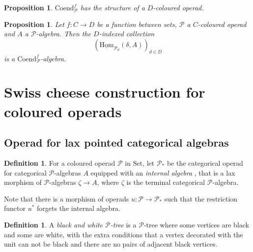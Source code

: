 \documentclass[]{amsart}
\newtheorem{proposition}[theorem]{Proposition}
\theoremstyle{definition}
\newtheorem{definition}[theorem]{Definition}
\begin{document}
\begin{proposition}\cite[Proposition 4.4]{mccluresmith}
	$\mathrm{Coend}_\mathcal{P}^f$ has the structure of a $D$-coloured operad.
\end{proposition}



\begin{proposition}\cite[Proposition 1.5]{BataninBergerLattice}\label{propositionalgebrascondensation}
	Let $f: C \to D$ be a function between sets, $\mathcal{P}$ a $C$-coloured operad and $A$ a $\mathcal{P}$-algebra. Then the $D$-indexed collection
	\[
		\left(\underline{\mathrm{Hom}}_{\mathcal{P}_d}(\delta,A)\right)_{d \in D}
	\]
	is a $\mathrm{Coend}_\mathcal{P}^f$-algebra.
\end{proposition}




\section{Swiss cheese construction for coloured operads}\label{sectionswisscheeseconstruction}

\subsection{Operad for lax pointed categorical algebras}

\begin{definition}
	For a coloured operad $\mathcal{P}$ in $\mathrm{Set}$, let $\mathcal{P}_*$ be the categorical operad for categorical $\mathcal{P}$-algebras $A$ equipped with an \emph{internal algebra} \cite[Definition 7.2]{batanin}, that is a lax morphism of $\mathcal{P}$-algebras $\zeta \to A$, where $\zeta$ is the terminal categorical $\mathcal{P}$-algebra.
\end{definition}


Note that there is a morphism of operads $u: \mathcal{P} \to \mathcal{P}_*$ such that the restriction functor $u^*$ forgets the internal algebra.

\begin{definition}
	A \emph{black and white $\mathcal{P}$-tree} is a $\mathcal{P}$-tree where some vertices are black and some are white, with the extra conditions that a vertex decorated with the unit can not be black and there are no pairs of adjacent black vertices.
\end{definition}
\end{document}
